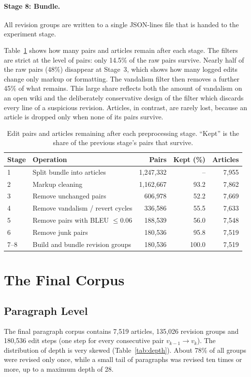 \documentclass[12pt,a4paper,oneside]{report}
\begin{document}
\paragraph{Stage 8: Bundle.} All revision groups are written to a single JSON-lines file that is handed to the experiment stage.

Table~\ref{tab:funnel} shows how many pairs and articles remain after each stage. The filters are strict at the level of pairs: only 14.5\% of the raw pairs survive. Nearly half of the raw pairs (48\%) disappear at Stage~3, which shows how many logged edits change only markup or formatting. The vandalism filter then removes a further 45\% of what remains. This large share reflects both the amount of vandalism on an open wiki and the deliberately conservative design of the filter which discards every line of a suspicious revision. Articles, in contrast, are rarely lost, because an article is dropped only when none of its pairs survive.

\begin{table}[ht]
\centering
\small
\caption[Pairs and articles remaining after each preprocessing stage]{Edit pairs and articles remaining after each preprocessing stage. ``Kept'' is the share of the previous stage's pairs that survive.}
\label{tab:funnel}
\begin{tabular}{@{}llrrr@{}}
\toprule
Stage & Operation & Pairs & Kept (\%) & Articles\\
\midrule
1 & Split bundle into articles & 1{,}247{,}332 & -- & 7{,}955\\
2 & Markup cleaning & 1{,}162{,}667 & 93.2 & 7{,}862\\
3 & Remove unchanged pairs & 606{,}978 & 52.2 & 7{,}669\\
4 & Remove vandalism / revert cycles & 336{,}586 & 55.5 & 7{,}633\\
5 & Remove pairs with BLEU $\le 0.06$ & 188{,}539 & 56.0 & 7{,}548\\
6 & Remove junk pairs & 180{,}536 & 95.8 & 7{,}519\\
7--8 & Build and bundle revision groups & 180{,}536 & 100.0 & 7{,}519\\
\bottomrule
\end{tabular}
\end{table}

\section{The Final Corpus}
\subsection{Paragraph Level}
The final paragraph corpus contains 7{,}519 articles, 135{,}026 revision groups and 180{,}536 edit steps (one step for every consecutive pair $v_{k-1}\to v_k$). The distribution of depth is very skewed (Table~\ref{tab:depth}). About 78\% of all groups were revised only once, while a small tail of paragraphs was revised ten times or more, up to a maximum depth of 28.
\end{document}
